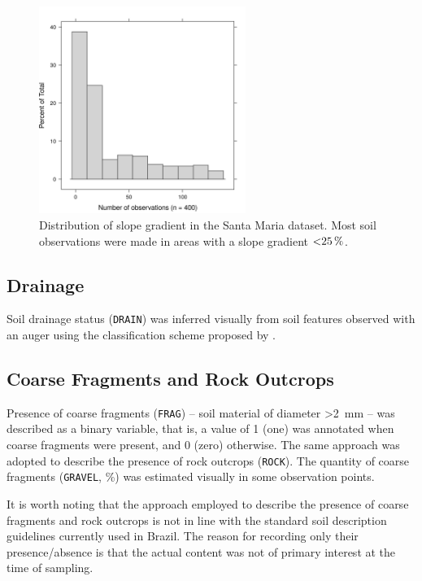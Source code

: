 \begin{figure}[!ht]
\centering
\includegraphics[width=0.60\textwidth]{fig/chap04-slope}
\caption[Distribution of slope gradient in the Santa Maria dataset.]{Distribution of slope gradient in the 
Santa Maria dataset. Most soil observations were made in areas with a slope gradient $\SI{<25}{\percent}$.}
\label{fig:chap04-slope}
\end{figure}

\subsection{Drainage}

Soil drainage status (\texttt{DRAIN}) was inferred visually from soil features observed with an auger using 
the classification scheme proposed by \citet{SantosEtAl2013}.

\subsection{Coarse Fragments and Rock Outcrops}

Presence of coarse fragments (\texttt{FRAG}) -- soil material of diameter \SI{>2}{\milli\metre} -- was 
described as a binary variable, that is, a value of \num{1} (one) was annotated when coarse fragments were 
present, and \num{0} (zero) otherwise. The same approach was adopted to describe the presence of rock outcrops 
(\texttt{ROCK}). The quantity of coarse fragments (\texttt{GRAVEL}, \si{\percent}) was estimated visually in 
some observation points.

It is worth noting that the approach employed to describe the presence of coarse fragments and rock outcrops 
is not in line with the standard soil description guidelines currently used in Brazil. The reason for 
recording only their presence/absence is that the actual content was not of primary interest at the time of 
sampling.


